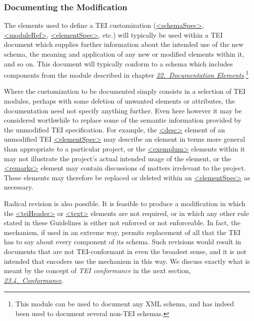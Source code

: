 \subsubsection[{Documenting the Modification}]{Documenting the Modification}\label{MDDO}\par
The elements used to define a TEI customization (\hyperref[TEI.schemaSpec]{<schemaSpec>}, \hyperref[TEI.moduleRef]{<moduleRef>}, \hyperref[TEI.elementSpec]{<elementSpec>}, etc.) will typically be used within a TEI document which supplies further information about the intended use of the new schema, the meaning and application of any new or modified elements within it, and so on. This document will typically conform to a  schema which includes components from the module described in chapter \textit{\hyperref[TD]{22.\ Documentation Elements}}.\footnote{This module can be used to document any XML schema, and has indeed been used to document several non-TEI schemas.}\par
Where the customization to be documented simply consists in a selection of TEI modules, perhaps with some deletion of unwanted elements or attributes, the documentation need not specify anything further. Even here however it may be considered worthwhile to replace some of the semantic information provided by the unmodified TEI specification. For example, the \hyperref[TEI.desc]{<desc>} element of an unmodified TEI \hyperref[TEI.elementSpec]{<elementSpec>} may describe an element in terms more general than appropriate to a particular project, or the \hyperref[TEI.exemplum]{<exemplum>} elements within it may not illustrate the project's actual intended usage of the element, or the \hyperref[TEI.remarks]{<remarks>} element may contain discussions of matters irrelevant to the project. These elements may therefore be replaced or deleted within an \hyperref[TEI.elementSpec]{<elementSpec>} as necessary.\par
Radical revision is also possible. It is feasible to produce a modification in which the \hyperref[TEI.teiHeader]{<teiHeader>} or \hyperref[TEI.text]{<text>} elements are not required, or in which any other rule stated in these Guidelines is either not enforced or not enforceable. In fact, the mechanism, if used in an extreme way, permits replacement of all that the TEI has to say about every component of its schema. Such revisions would result in documents that are not TEI-conformant in even the broadest sense, and it is not intended that encoders use the mechanism in this way. We discuss exactly what is meant by the concept of \textit{TEI conformance} in the next section, \textit{\hyperref[CF]{23.4.\ Conformance}}.
